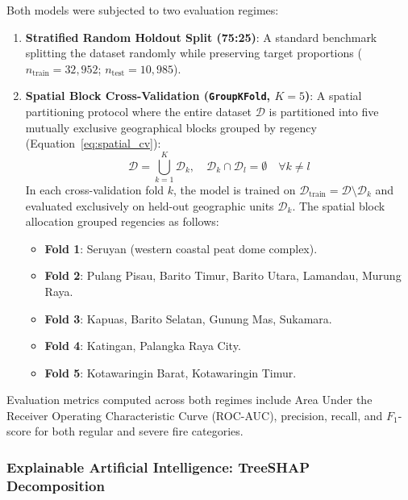 Both models were subjected to two evaluation regimes:
\begin{enumerate}
    \item \textbf{Stratified Random Holdout Split (75:25)}: A standard benchmark splitting the dataset randomly while preserving target proportions ($n_{\text{train}} = 32,952$; $n_{\text{test}} = 10,985$).
    \item \textbf{Spatial Block Cross-Validation (\texttt{GroupKFold}, $K=5$)}: A spatial partitioning protocol where the entire dataset $\mathcal{D}$ is partitioned into five mutually exclusive geographical blocks grouped by regency (Equation~\eqref{eq:spatial_cv}):
    \begin{equation}
    \mathcal{D} = \bigcup_{k=1}^{K} \mathcal{D}_k, \quad \mathcal{D}_k \cap \mathcal{D}_l = \emptyset \quad \forall k \ne l
    \label{eq:spatial_cv}
    \end{equation}
    In each cross-validation fold $k$, the model is trained on $\mathcal{D}_{\text{train}} = \mathcal{D} \setminus \mathcal{D}_k$ and evaluated exclusively on held-out geographic units $\mathcal{D}_k$. The spatial block allocation grouped regencies as follows:
    \begin{itemize}
        \item \textbf{Fold 1}: Seruyan (western coastal peat dome complex).
        \item \textbf{Fold 2}: Pulang Pisau, Barito Timur, Barito Utara, Lamandau, Murung Raya.
        \item \textbf{Fold 3}: Kapuas, Barito Selatan, Gunung Mas, Sukamara.
        \item \textbf{Fold 4}: Katingan, Palangka Raya City.
        \item \textbf{Fold 5}: Kotawaringin Barat, Kotawaringin Timur.
    \end{itemize}
\end{enumerate}

Evaluation metrics computed across both regimes include Area Under the Receiver Operating Characteristic Curve (ROC-AUC), precision, recall, and $F_1$-score for both regular and severe fire categories.

\subsubsection{Explainable Artificial Intelligence: TreeSHAP Decomposition}
\label{subsubsec:treeshap}

